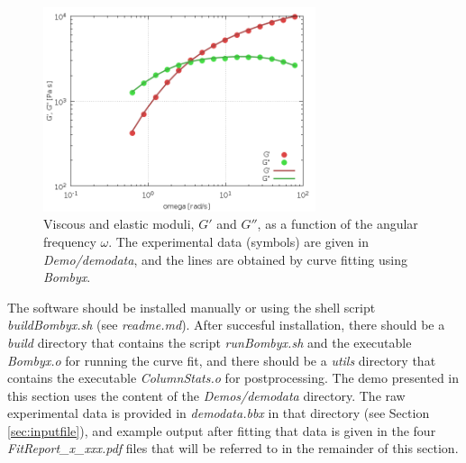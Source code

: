 \documentclass[  superscriptaddress]{revtex4}
\begin{document}
\begin{figure}[h]
  \centering
  \includegraphics*[width=8cm]{../Demos/demodata/img/StickyReptation.png}
  \caption{Viscous and elastic moduli, $G'$ and $G''$, as a function of the angular frequency $\omega$. The experimental data (symbols) are given in \emph{Demo/demodata}, and the lines are obtained by curve fitting using \emph{Bombyx}.  }
  \label{fig:SRfit}
\end{figure}


The software should be installed manually or using the shell script \emph{buildBombyx.sh} (see \emph{readme.md}). 
After succesful installation, there should be a \emph{build} directory that contains the script \emph{runBombyx.sh} and the executable \emph{Bombyx.o} for running the curve fit, and there should be a \emph{utils} directory that contains the executable \emph{ColumnStats.o} for postprocessing.
The demo presented in this section uses the content of the \emph{Demos/demodata} directory.
The raw experimental data is provided in \emph{demodata.bbx} in that directory (see Section \ref{sec:inputfile}), and example output after fitting that data is given in the four \emph{FitReport\_x\_xxx.pdf} files that will be referred to in the remainder of this section.
\end{document}
